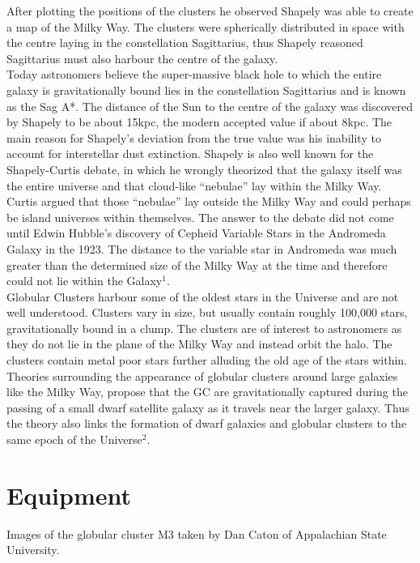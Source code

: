 \documentclass{article}
\begin{document}
After plotting the positions of the clusters he observed Shapely was able to create a map of the Milky Way. The clusters were spherically distributed in space with the centre laying in the constellation Sagittarius, thus Shapely reasoned Sagittarius must also harbour the centre of the galaxy.\\

Today astronomers believe the super-massive black hole to which the entire galaxy is gravitationally bound lies in the constellation Sagittarius and is known as the Sag A*. The distance of the Sun to the centre of the galaxy was discovered by Shapely to be about 15kpc, the modern accepted value if about 8kpc. The main reason for Shapely’s deviation from the true value was his inability to account for interstellar dust extinction. Shapely is also well known for the Shapely-Curtis debate, in which he wrongly theorized that the galaxy itself was the entire universe and that cloud-like “nebulae” lay within the Milky Way. Curtis argued that those “nebulae” lay outside the Milky Way and could perhaps be island universes within themselves. The answer to the debate did not come until Edwin Hubble’s discovery of Cepheid Variable Stars in the Andromeda Galaxy in the 1923. The distance to the variable star in Andromeda was much greater than the determined size of the Milky Way at the time and therefore could not lie within the Galaxy$^1$.\\

Globular Clusters harbour some of the oldest stars in the Universe and are not well understood. Clusters vary in size, but usually contain roughly 100,000 stars, gravitationally bound in a clump. The clusters are of interest to astronomers as they do not lie in the plane of the Milky Way and instead orbit the halo. The clusters contain metal poor stars further alluding the old age of the stars within. Theories surrounding the appearance of globular clusters around large galaxies like the Milky Way, propose that the GC are gravitationally captured during the passing of a small dwarf satellite galaxy as it travels near the larger galaxy. Thus the theory also links the formation of dwarf galaxies and globular clusters to the same epoch of the Universe$^2$.
\section{Equipment}
Images of the globular cluster M3 taken by Dan Caton of Appalachian State University.\\
\end{document}
